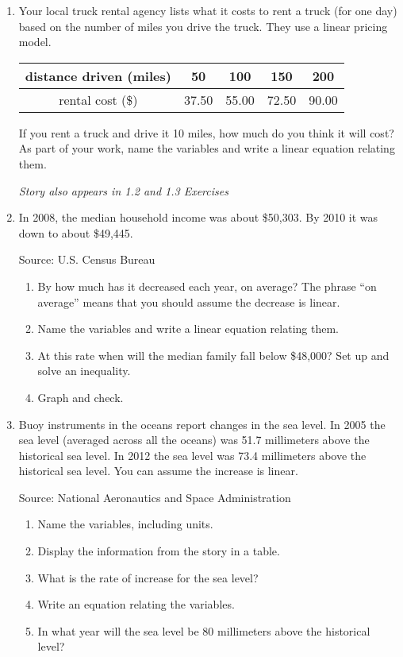 \begin{enumerate}
\item Your local truck rental agency lists what it costs to rent a truck (for one day) based on the number of miles you drive the truck.  They use a linear pricing model.
\begin{center}
\begin{tabular} {|c| |c |c|c|c|} \hline
distance driven (miles) & 50 & 100 & 150 & 200 \\ \hline
rental cost (\$) & 37.50 & 55.00 & 72.50 & 90.00 \\ \hline
\end{tabular}
\end{center}
If you rent a truck and drive it 10 miles, how much do you think it will cost?  As part of your work, name the variables and write a linear equation relating them.

\hfill \emph{Story also appears in 1.2 and 1.3 Exercises}

\item In 2008, the median household income was about \$50,303.  By 2010 it was down to about \$49,445.
\hfill \begin{footnotesize} Source:  U.S. Census Bureau \end{footnotesize}
\begin{enumerate}
\item By how much has it decreased each year, on average? The phrase ``on average'' means that you should assume the decrease is linear.
\item Name the variables and write a linear equation relating them.
\item At this rate when will the median family fall below \$48,000?  Set up and solve an inequality.
\item Graph and check.
\end{enumerate}

\item Buoy instruments in the oceans report changes in the sea level.  In 2005 the sea level (averaged across all the oceans) was 51.7 millimeters above the historical sea level.  In 2012 the sea level was 73.4 millimeters above the historical sea level.  You can assume the increase is linear.
\hfill \begin{footnotesize} Source:  National Aeronautics and Space Administration \end{footnotesize}
\begin{enumerate}
\item Name the variables, including units.
\item Display the information from the story in a table.
\item What is the rate of increase for the sea level?
\item Write an equation relating the variables.
\item In what year will the sea level be 80 millimeters above the historical level?
\end{enumerate} %

\end{enumerate}